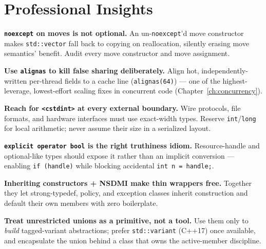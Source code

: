 \section{Professional Insights}

\textbf{\texttt{noexcept} on moves is not optional.} An un-\texttt{noexcept}'d move constructor makes \texttt{std::vector} fall back to copying on reallocation, silently erasing move semantics' benefit. Audit every move constructor and move assignment.

\textbf{Use \texttt{alignas} to kill false sharing deliberately.} Align hot, independently-written per-thread fields to a cache line (\texttt{alignas(64)}) --- one of the highest-leverage, lowest-effort scaling fixes in concurrent code (Chapter~\ref{ch:concurrency}).

\textbf{Reach for \texttt{<cstdint>} at every external boundary.} Wire protocols, file formats, and hardware interfaces must use exact-width types. Reserve \texttt{int}/\texttt{long} for local arithmetic; never assume their size in a serialized layout.

\textbf{\texttt{explicit operator bool} is the right truthiness idiom.} Resource-handle and optional-like types should expose it rather than an implicit conversion --- enabling \texttt{if (handle)} while blocking accidental \texttt{int n = handle;}.

\textbf{Inheriting constructors + NSDMI make thin wrappers free.} Together they let strong-typedef, policy, and exception classes inherit construction and default their own members with zero boilerplate.

\textbf{Treat unrestricted unions as a primitive, not a tool.} Use them only to \emph{build} tagged-variant abstractions; prefer \texttt{std::variant} (C++17) once available, and encapsulate the union behind a class that owns the active-member discipline.
